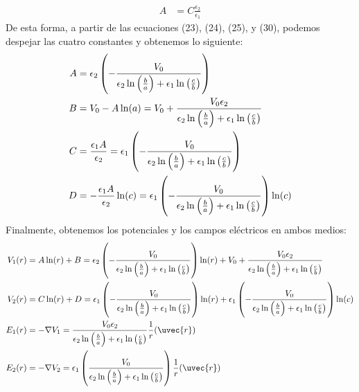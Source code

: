 \documentclass[
  11pt,
  letterpaper,
   answers
  ]{exam}
\begin{document}
\begin{questions}
\begin{solution}
\begin{parts}
\begin{align}
        A &= C \frac{\epsilon_2}{\epsilon_1}
    \end{align} 
    De esta forma, a partir de las ecuaciones (23), (24), (25), y (30), podemos despejar las cuatro constantes y obtenemos lo siguiente:
    \begin{align}
      A&= \epsilon_{2}\del{-\frac{V_{0}}{\epsilon_{2}\ln\del{\frac{b}{a}} + \epsilon_{1}\ln\del{\frac{c}{b}}}}\\ 
      B &= V_{0} - A\ln(a)  = V_{0} + \frac{V_{0}\epsilon_{2}}{\epsilon_{2}\ln\del{\frac{b}{a}} + \epsilon_{1}\ln\del{\frac{c}{b}}}\\ 
      C &=  \frac{\epsilon_{1}A}{\epsilon_{2}} =\epsilon_{1}\del{-\frac{V_{0}}{\epsilon_{2}\ln\del{\frac{b}{a}} + \epsilon_{1}\ln\del{\frac{c}{b}}}}\\ 
      D&=-\frac{\epsilon_{1}A}{\epsilon_{2}} \ln(c) = \epsilon_{1}\del{-\frac{V_{0}}{\epsilon_{2}\ln\del{\frac{b}{a}} + \epsilon_{1}\ln\del{\frac{c}{b}}}}\ln(c)
    \end{align}
    Finalmente, obtenemos los potenciales y los campos eléctricos en ambos medios:
    \begin{align}
      V_{1}(r) &=  A\ln(r) + B =  \epsilon_{2}\del{-\frac{V_{0} }{\epsilon_{2}\ln\del{\frac{b}{a}} + \epsilon_{1}\ln\del{\frac{c}{b}}}} \ln(r) + V_{0} + \frac{V_{0}\epsilon_{2}}{\epsilon_{2}\ln\del{\frac{b}{a}} + \epsilon_{1}\ln\del{\frac{c}{b}}} \\
      V_{2}(r) &= C\ln(r) + D =\epsilon_{1}\del{-\frac{V_{0}}{\epsilon_{2}\ln\del{\frac{b}{a}} + \epsilon_{1}\ln\del{\frac{c}{b}}}} \ln(r)+\epsilon_{1}\del{-\frac{V_{0}}{\epsilon_{2}\ln\del{\frac{b}{a}} + \epsilon_{1}\ln\del{\frac{c}{b}}}}\ln(c) \\
      E_{1}(r) &= -\nabla V_{1} = \frac{V_{0}\epsilon_{2}}{\epsilon_{2}\ln\del{\frac{b}{a}} + \epsilon_{1}\ln\del{\frac{c}{b}}} \frac{1}{r}(\uvec{r}) \\
      E_{2}(r) &= -\nabla V_{2} =  \epsilon_{1}\del{\frac{V_{0}}{\epsilon_{2}\ln\del{\frac{b}{a}} + \epsilon_{1}\ln\del{\frac{c}{b}}}} \frac{1}{r} (\uvec{r})
    \end{align}


\end{parts}
\end{solution}
\end{questions}
\end{document}
